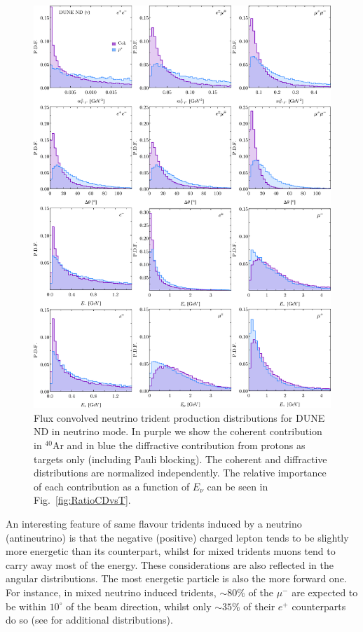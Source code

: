 %
\begin{figure}[H]
\centering
\includegraphics[width=\textwidth]{figs/DUNE_nu_3horn_mll_theta_E.pdf}
\caption{Flux convolved neutrino trident production distributions for DUNE ND in neutrino mode. In purple we show the coherent contribution in $^{40}$Ar and in blue the diffractive contribution from protons as targets only (including Pauli blocking). The coherent and diffractive distributions are normalized independently. The relative importance of each contribution as a function of $E_\nu$
can be seen in Fig.~\ref{fig:RatioCDvsT}.
%
\label{fig:DUNE_ND_dist}}
\end{figure}
%


An interesting feature of same flavour tridents induced by a neutrino (antineutrino) is that the negative (positive) charged lepton tends to be slightly more energetic than its counterpart, whilst for mixed tridents muons tend to carry away most of the energy. These considerations are also reflected in the angular distributions. The most energetic particle is also the more forward one. For instance, in mixed neutrino induced tridents, $\sim 80 \%$ of the $\mu^-$ are expected to be within $10^\circ$ of the beam direction, whilst only $\sim 35 \%$ of their $e^+$ counterparts do so (see  for additional distributions).


